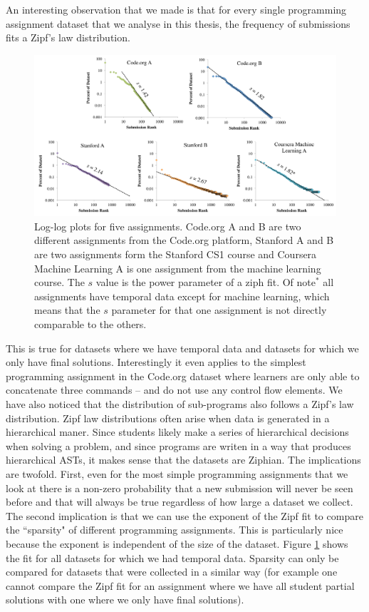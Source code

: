 An interesting observation that we made is that for every single programming assignment dataset that we analyse in this thesis, the frequency of submissions fits a Zipf's law distribution. 
\begin{figure}[ht]
\center
\includegraphics[width=1.0\textwidth]{img/zipfAll}
\caption[Submission Sparcity]{
Log-log plots for five assignments. Code.org A and B are two different assignments from the Code.org platform, Stanford A and B are two assignments form the Stanford CS1 course and Coursera Machine Learning A is one assignment from the machine learning course. The $s$ value is the power parameter of a ziph fit. Of note$^*$ all assignments have temporal data except for machine learning, which means that the $s$ parameter for that one assignment is not directly comparable to the others.
}
\label{fig:zipfAll}
\end{figure}
This is true for datasets where we have temporal data and datasets for which we only have final solutions. Interestingly it even applies to the simplest programming assignment in the Code.org dataset where learners are only able to concatenate three commands -- and do not use any control flow elements. We have also noticed that the distribution of sub-programs also follows a Zipf's law distribution. Zipf law distributions often arise when data is generated in a hierarchical maner. Since students likely make a series of hierarchical decisions when solving a problem, and since programs are writen in a way that produces hierarchical ASTs, it makes sense that the datasets are Ziphian. The implications are twofold. First, even for the most simple programming assignments that we look at there is a non-zero probability that a new submission will never be seen before and that will always be true regardless of how large a dataset we collect. The second implication is that we can use the exponent of the Zipf fit to compare the ``sparsity" of different programming assignments. This is particularly nice because the exponent is independent of the size of the dataset. Figure \ref{fig:zipfAll} shows the fit for all datasets for which we had temporal data. Sparsity can only be compared for datasets that were collected in a similar way (for example one cannot compare the Zipf fit for an assignment where we have all student partial solutions with one where we only have final solutions).

